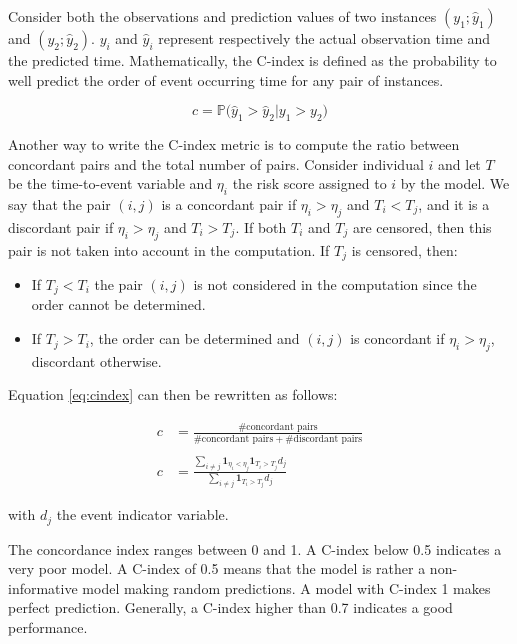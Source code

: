 \documentclass[
]{book}
\providecommand{\tightlist}{%
  \setlength{\itemsep}{0pt}\setlength{\parskip}{0pt}}
\begin{document}
Consider both the observations and prediction values of two instances \((y_1; \hat{y}_1)\) and \((y_2; \hat{y}_2)\). \(y_i\) and \(\hat{y}_i\) represent respectively the actual observation time and the predicted time. Mathematically, the C-index is defined as the probability to well predict the order of event occurring time for any pair of instances.

\begin{equation}
  c = \mathbb{P}\big(\hat{y}_1 > \hat{y}_2 | y_1 > y_2\big)
  \label{eq:cindex}
\end{equation}

Another way to write the C-index metric is to compute the ratio between concordant pairs and the total number of pairs. Consider individual \(i\) and let \(T\) be the time-to-event variable and \(\eta_i\) the risk score assigned to \(i\) by the model. We say that the pair \((i, j)\) is a concordant pair if \(\eta_i > \eta_j\) and \(T_i < T_j\), and it is a discordant pair if \(\eta_i > \eta_j\) and \(T_i > T_j\). If both \(T_i\) and \(T_j\) are censored, then this pair is not taken into account in the computation. If \(T_j\) is censored, then:

\begin{itemize}
\tightlist
\item
  If \(T_j < T_i\) the pair \((i, j)\) is not considered in the computation since the order cannot be determined.
\item
  If \(T_j > T_i\), the order can be determined and \((i, j)\) is concordant if \(\eta_i > \eta_j\), discordant otherwise.
\end{itemize}

Equation \eqref{eq:cindex} can then be rewritten as follows:

\begin{equation}
\begin{aligned}
c & = \frac{\# \text{concordant pairs}}{\# \text{concordant pairs} + \# \text{discordant pairs}} \\\\
c & = \frac{\sum_{i \neq j} \pmb{1}_{\eta_i < \eta_j} \pmb{1}_{T_i > T_j}d_j}{\sum_{i \neq j} \pmb{1}_{T_i > T_j}d_j}
\end{aligned}
\label{eq:cindex2}
\end{equation}

with \(d_j\) the event indicator variable.

The concordance index ranges between 0 and 1. A C-index below 0.5 indicates a very poor model. A C-index of 0.5 means that the model is rather a non-informative model making random predictions. A model with C-index 1 makes perfect prediction. Generally, a C-index higher than 0.7 indicates a good performance.
\end{document}
